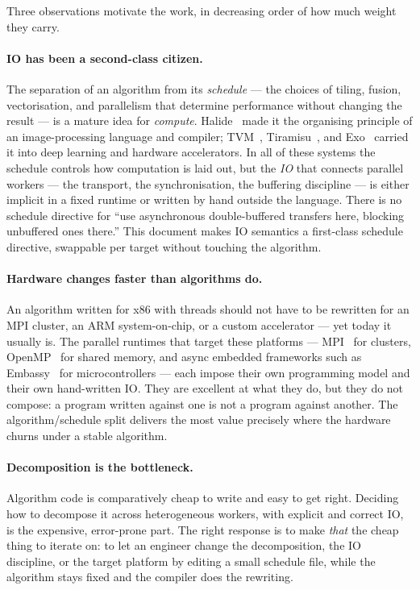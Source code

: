Three observations motivate the work, in decreasing order of how much weight
they carry.

\paragraph{IO has been a second-class citizen.} The separation of an algorithm
from its \emph{schedule} --- the choices of tiling, fusion, vectorisation, and
parallelism that determine performance without changing the result --- is a
mature idea for \emph{compute}. Halide~\cite{ragan-kelley2013halide} made it the
organising principle of an image-processing language and compiler;
TVM~\cite{chen2018tvm}, Tiramisu~\cite{baghdadi2019tiramisu}, and
Exo~\cite{ikarashi2022exo} carried it into deep learning and hardware
accelerators. In all of these systems the schedule controls how computation is
laid out, but the \emph{IO} that connects parallel workers --- the transport,
the synchronisation, the buffering discipline --- is either implicit in a fixed
runtime or written by hand outside the language. There is no schedule directive
for ``use asynchronous double-buffered transfers here, blocking unbuffered ones
there.'' This document makes IO semantics a first-class schedule directive,
swappable per target without touching the algorithm.

\paragraph{Hardware changes faster than algorithms do.} An algorithm written for
x86 with threads should not have to be rewritten for an MPI cluster, an ARM
system-on-chip, or a custom accelerator --- yet today it usually is. The
parallel runtimes that target these platforms --- MPI~\cite{mpiforum2021} for
clusters, OpenMP~\cite{dagum1998openmp} for shared memory, and async embedded
frameworks such as Embassy~\cite{embassy} for microcontrollers --- each impose
their own programming model and their own hand-written IO. They are excellent at
what they do, but they do not compose: a program written against one is not a
program against another. The algorithm/schedule split delivers the most value
precisely where the hardware churns under a stable algorithm.

\paragraph{Decomposition is the bottleneck.} Algorithm code is comparatively
cheap to write and easy to get right. Deciding how to decompose it across
heterogeneous workers, with explicit and correct IO, is the expensive,
error-prone part. The right response is to make \emph{that} the cheap thing to
iterate on: to let an engineer change the decomposition, the IO discipline, or
the target platform by editing a small schedule file, while the algorithm stays
fixed and the compiler does the rewriting.


